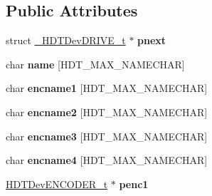 \subsection*{\-Public \-Attributes}
\begin{DoxyCompactItemize}
\item 
\hypertarget{struct___h_d_t_dev_d_r_i_v_e__t_a421e90684f35dafa06e354936ead409d}{struct \hyperlink{struct___h_d_t_dev_d_r_i_v_e__t}{\-\_\-\-H\-D\-T\-Dev\-D\-R\-I\-V\-E\-\_\-t} $\ast$ {\bfseries pnext}}\label{struct___h_d_t_dev_d_r_i_v_e__t_a421e90684f35dafa06e354936ead409d}

\item 
\hypertarget{struct___h_d_t_dev_d_r_i_v_e__t_abe5466856381627eed85e62d504cc0f2}{char {\bfseries name} \mbox{[}\-H\-D\-T\-\_\-\-M\-A\-X\-\_\-\-N\-A\-M\-E\-C\-H\-A\-R\mbox{]}}\label{struct___h_d_t_dev_d_r_i_v_e__t_abe5466856381627eed85e62d504cc0f2}

\item 
\hypertarget{struct___h_d_t_dev_d_r_i_v_e__t_aca1c0e442c6ffc942e2bb9ebbb4413df}{char {\bfseries encname1} \mbox{[}\-H\-D\-T\-\_\-\-M\-A\-X\-\_\-\-N\-A\-M\-E\-C\-H\-A\-R\mbox{]}}\label{struct___h_d_t_dev_d_r_i_v_e__t_aca1c0e442c6ffc942e2bb9ebbb4413df}

\item 
\hypertarget{struct___h_d_t_dev_d_r_i_v_e__t_a739afaccfc47830ae6a277953e267729}{char {\bfseries encname2} \mbox{[}\-H\-D\-T\-\_\-\-M\-A\-X\-\_\-\-N\-A\-M\-E\-C\-H\-A\-R\mbox{]}}\label{struct___h_d_t_dev_d_r_i_v_e__t_a739afaccfc47830ae6a277953e267729}

\item 
\hypertarget{struct___h_d_t_dev_d_r_i_v_e__t_abdb6103533fac447f2e4d73cafe60894}{char {\bfseries encname3} \mbox{[}\-H\-D\-T\-\_\-\-M\-A\-X\-\_\-\-N\-A\-M\-E\-C\-H\-A\-R\mbox{]}}\label{struct___h_d_t_dev_d_r_i_v_e__t_abdb6103533fac447f2e4d73cafe60894}

\item 
\hypertarget{struct___h_d_t_dev_d_r_i_v_e__t_af3a9ea1a553946924ab7d59a10ea284a}{char {\bfseries encname4} \mbox{[}\-H\-D\-T\-\_\-\-M\-A\-X\-\_\-\-N\-A\-M\-E\-C\-H\-A\-R\mbox{]}}\label{struct___h_d_t_dev_d_r_i_v_e__t_af3a9ea1a553946924ab7d59a10ea284a}

\item 
\hypertarget{struct___h_d_t_dev_d_r_i_v_e__t_aac70fa97a0051a317bf31d4700348ff2}{\hyperlink{struct___h_d_t_dev_e_n_c_o_d_e_r__t}{\-H\-D\-T\-Dev\-E\-N\-C\-O\-D\-E\-R\-\_\-t} $\ast$ {\bfseries penc1}}\label{struct___h_d_t_dev_d_r_i_v_e__t_aac70fa97a0051a317bf31d4700348ff2}


\end{DoxyCompactItemize}
